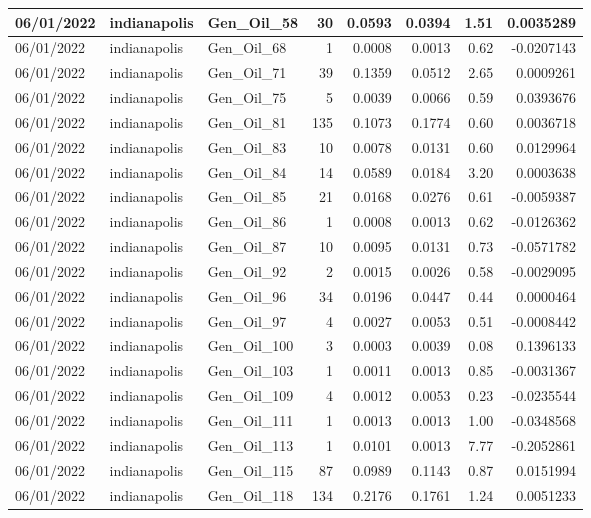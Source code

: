 \documentclass[
  letterpaper,
  DIV=11,
  numbers=noendperiod]{scrartcl}
\begin{document}
\begin{tabular}{l|l|l|r|r|r|r|r}
\hline
06/01/2022 & indianapolis & Gen\_Oil\_58 & 30 & 0.0593 & 0.0394 & 1.51 & 0.0035289\\
\hline
06/01/2022 & indianapolis & Gen\_Oil\_68 & 1 & 0.0008 & 0.0013 & 0.62 & -0.0207143\\
\hline
06/01/2022 & indianapolis & Gen\_Oil\_71 & 39 & 0.1359 & 0.0512 & 2.65 & 0.0009261\\
\hline
06/01/2022 & indianapolis & Gen\_Oil\_75 & 5 & 0.0039 & 0.0066 & 0.59 & 0.0393676\\
\hline
06/01/2022 & indianapolis & Gen\_Oil\_81 & 135 & 0.1073 & 0.1774 & 0.60 & 0.0036718\\
\hline
06/01/2022 & indianapolis & Gen\_Oil\_83 & 10 & 0.0078 & 0.0131 & 0.60 & 0.0129964\\
\hline
06/01/2022 & indianapolis & Gen\_Oil\_84 & 14 & 0.0589 & 0.0184 & 3.20 & 0.0003638\\
\hline
06/01/2022 & indianapolis & Gen\_Oil\_85 & 21 & 0.0168 & 0.0276 & 0.61 & -0.0059387\\
\hline
06/01/2022 & indianapolis & Gen\_Oil\_86 & 1 & 0.0008 & 0.0013 & 0.62 & -0.0126362\\
\hline
06/01/2022 & indianapolis & Gen\_Oil\_87 & 10 & 0.0095 & 0.0131 & 0.73 & -0.0571782\\
\hline
06/01/2022 & indianapolis & Gen\_Oil\_92 & 2 & 0.0015 & 0.0026 & 0.58 & -0.0029095\\
\hline
06/01/2022 & indianapolis & Gen\_Oil\_96 & 34 & 0.0196 & 0.0447 & 0.44 & 0.0000464\\
\hline
06/01/2022 & indianapolis & Gen\_Oil\_97 & 4 & 0.0027 & 0.0053 & 0.51 & -0.0008442\\
\hline
06/01/2022 & indianapolis & Gen\_Oil\_100 & 3 & 0.0003 & 0.0039 & 0.08 & 0.1396133\\
\hline
06/01/2022 & indianapolis & Gen\_Oil\_103 & 1 & 0.0011 & 0.0013 & 0.85 & -0.0031367\\
\hline
06/01/2022 & indianapolis & Gen\_Oil\_109 & 4 & 0.0012 & 0.0053 & 0.23 & -0.0235544\\
\hline
06/01/2022 & indianapolis & Gen\_Oil\_111 & 1 & 0.0013 & 0.0013 & 1.00 & -0.0348568\\
\hline
06/01/2022 & indianapolis & Gen\_Oil\_113 & 1 & 0.0101 & 0.0013 & 7.77 & -0.2052861\\
\hline
06/01/2022 & indianapolis & Gen\_Oil\_115 & 87 & 0.0989 & 0.1143 & 0.87 & 0.0151994\\
\hline
06/01/2022 & indianapolis & Gen\_Oil\_118 & 134 & 0.2176 & 0.1761 & 1.24 & 0.0051233\\

\end{tabular}
\end{document}
